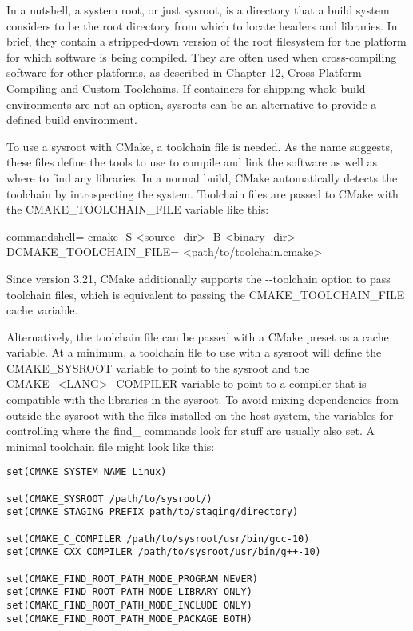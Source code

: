 In a nutshell, a system root, or just sysroot, is a directory that a build system considers to be the root directory from which to locate headers and libraries. In brief, they contain a stripped-down version of the root filesystem for the platform for which software is being compiled. They are often used when cross-compiling software for other platforms, as described in Chapter 12, Cross-Platform Compiling and Custom Toolchains. If containers for shipping whole build environments are not an option, sysroots can be an alternative to provide a defined build environment.

To use a sysroot with CMake, a toolchain file is needed. As the name suggests, these files define the tools to use to compile and link the software as well as where to find any libraries. In a normal build, CMake automatically detects the toolchain by introspecting the system. Toolchain files are passed to CMake with the CMAKE\_TOOLCHAIN\_FILE variable like this:

\begin{tcblisting}{commandshell={}}
cmake -S <source_dir> -B <binary_dir> -DCMAKE_TOOLCHAIN_FILE=
  <path/to/toolchain.cmake>
\end{tcblisting}

Since version 3.21, CMake additionally supports the -{}-toolchain option to pass toolchain files, which is equivalent to passing the CMAKE\_TOOLCHAIN\_FILE cache variable.

Alternatively, the toolchain file can be passed with a CMake preset as a cache variable. At a minimum, a toolchain file to use with a sysroot will define the CMAKE\_SYSROOT variable to point to the sysroot and the CMAKE\_<LANG>\_COMPILER variable to point to a compiler that is compatible with the libraries in the sysroot. To avoid mixing dependencies from outside the sysroot with the files installed on the host system, the variables for controlling where the find\_ commands look for stuff are usually also set. A minimal toolchain file might look like this:

\begin{lstlisting}[style=styleCMake]
set(CMAKE_SYSTEM_NAME Linux)

set(CMAKE_SYSROOT /path/to/sysroot/)
set(CMAKE_STAGING_PREFIX path/to/staging/directory)

set(CMAKE_C_COMPILER /path/to/sysroot/usr/bin/gcc-10)
set(CMAKE_CXX_COMPILER /path/to/sysroot/usr/bin/g++-10)

set(CMAKE_FIND_ROOT_PATH_MODE_PROGRAM NEVER)
set(CMAKE_FIND_ROOT_PATH_MODE_LIBRARY ONLY)
set(CMAKE_FIND_ROOT_PATH_MODE_INCLUDE ONLY)
set(CMAKE_FIND_ROOT_PATH_MODE_PACKAGE BOTH)
\end{lstlisting}

